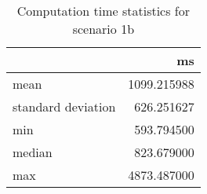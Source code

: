 \begin{table}
\caption{Computation time statistics for scenario 1b}
\label{tab:comp_stats_scenario_1b}
\begin{tabular}{lr}
\toprule
 & ms \\
\midrule
mean & 1099.215988 \\
standard deviation & 626.251627 \\
min & 593.794500 \\
median & 823.679000 \\
max & 4873.487000 \\
\bottomrule
\end{tabular}
\end{table}
